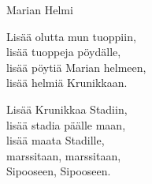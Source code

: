 \begin{song}{Marian Helmi}
	
	
	
	
	Lisää olutta mun tuoppiin,\\
	lisää tuoppeja pöydälle,\\
	lisää pöytiä Marian helmeen,\\
	lisää helmiä Krunikkaan.
	
	Lisää Krunikkaa Stadiin,\\
	lisää stadia päälle maan,\\
	lisää maata Stadille,\\
	marssitaan, marssitaan,\\
	Sipooseen, Sipooseen.
	
\end{song}
